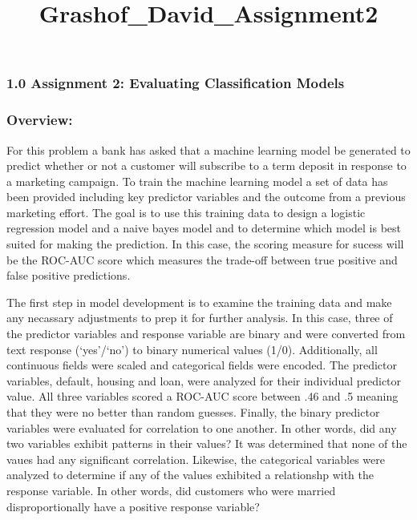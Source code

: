 \documentclass[11pt]{article}
\title{Grashof\_David\_Assignment2}
\begin{document}
    
    
    \maketitle
    
    

    
    \hypertarget{assignment-2-evaluating-classification-models}{%
\subsubsection{1.0 \textbar{} Assignment 2: Evaluating Classification
Models}\label{assignment-2-evaluating-classification-models}}

\hypertarget{overview}{%
\subsubsection{Overview:}\label{overview}}

For this problem a bank has asked that a machine learning model be
generated to predict whether or not a customer will subscribe to a term
deposit in response to a marketing campaign. To train the machine
learning model a set of data has been provided including key predictor
variables and the outcome from a previous marketing effort. The goal is
to use this training data to design a logistic regression model and a
naive bayes model and to determine which model is best suited for making
the prediction. In this case, the scoring measure for sucess will be the
ROC-AUC score which measures the trade-off between true positive and
false positive predictions.

The first step in model development is to examine the training data and
make any necassary adjustments to prep it for further analysis. In this
case, three of the predictor variables and response variable are binary
and were converted from text response (`yes'/`no') to binary numerical
values (1/0). Additionally, all continuous fields were scaled and
categorical fields were encoded. The predictor variables, default,
housing and loan, were analyzed for their individual predictor value.
All three variables scored a ROC-AUC score between .46 and .5 meaning
that they were no better than random guesses. Finally, the binary
predictor variables were evaluated for correlation to one another. In
other words, did any two variables exhibit patterns in their values? It
was determined that none of the vaues had any significant correlation.
Likewise, the categorical variables were analyzed to determine if any of
the values exhibited a relationshp with the response variable. In other
words, did customers who were married disproportionally have a positive
response variable?
\end{document}
